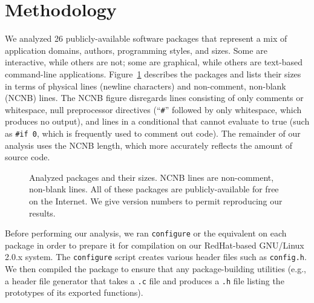 \documentclass[10pt]{article}
\def\numpackages{26}
\newcommand{\file}[1]{\texttt{#1}}
\newcommand{\captionsmall}[1]{\caption[]{\small #1}}
\begin{document}
%






\section{Methodology}
\label{sec:methodology}

We analyzed {\numpackages} publicly-available software packages that
represent a mix of application domains, authors, programming styles, and
sizes.  Some are interactive, while others are not; some are graphical,
while others are text-based command-line applications.
Figure~\ref{fig:packages} describes the packages and lists their sizes in
terms of physical lines (newline characters) and non-comment, non-blank
(NCNB) lines.  The NCNB figure disregards lines consisting of only comments
or whitespace,  null preprocessor directives
(``{\tt \#}'' followed by only whitespace, which produces no output), and
lines in a conditional that cannot evaluate to
true (such as {\tt \#if 0}, which is frequently used to comment out code).
The remainder of our analysis uses the NCNB length, which more accurately
reflects the amount of source code.

\begin{figure}
\centering
{\small
  \setlength{\tabcolsep}{.25em}
  
}
\captionsmall{Analyzed packages and their sizes.  NCNB lines are non-comment,
  non-blank lines.  All of these packages are publicly-available for free
  on the Internet.  We give version numbers to permit reproducing our results.}
\label{fig:packages}
\end{figure}

Before performing our analysis, we ran {\tt configure} or the equivalent on
each package in order to prepare it for compilation on our RedHat-based
GNU/Linux 2.0.x system.  The {\tt configure} script creates various
header files such as \file{config.h}.  We then 
compiled the package to ensure that any package-building utilities
(e.g., a header file generator that takes a {\tt .c} file and produces a 
{\tt .h} file listing the prototypes of its exported functions).
\end{document}
